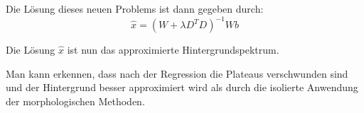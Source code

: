 \documentclass{article}
\theoremstyle{plain}
\theoremstyle{definition}
\begin{document}
Die Lösung dieses neuen Problems ist dann gegeben durch:
\begin{equation}
    \hat{x} = (W + \lambda D^TD)^{-1}Wb
\end{equation}

Die Lösung $\hat{x}$ ist nun das approximierte Hintergrundspektrum.

Man kann erkennen, dass nach der Regression die Plateaus verschwunden sind und der Hintergrund besser approximiert wird als durch die isolierte Anwendung der morphologischen Methoden. 

\clearpage

\end{document}

